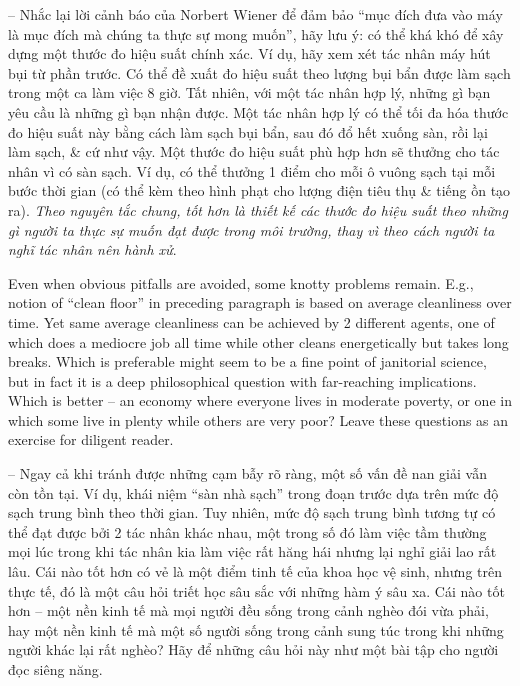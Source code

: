 \documentclass{article}
\begin{document}
\begin{itemize}
\begin{itemize}
\begin{itemize}
\begin{itemize}
				-- Nhắc lại lời cảnh báo của {\sc Norbert Wiener} để đảm bảo ``mục đích đưa vào máy là mục đích mà chúng ta thực sự mong muốn'', hãy lưu ý: có thể khá khó để xây dựng một thước đo hiệu suất chính xác. Ví dụ, hãy xem xét tác nhân máy hút bụi từ phần trước. Có thể đề xuất đo hiệu suất theo lượng bụi bẩn được làm sạch trong một ca làm việc 8 giờ. Tất nhiên, với một tác nhân hợp lý, những gì bạn yêu cầu là những gì bạn nhận được. Một tác nhân hợp lý có thể tối đa hóa thước đo hiệu suất này bằng cách làm sạch bụi bẩn, sau đó đổ hết xuống sàn, rồi lại làm sạch, \& cứ như vậy. Một thước đo hiệu suất phù hợp hơn sẽ thưởng cho tác nhân vì có sàn sạch. Ví dụ, có thể thưởng 1 điểm cho mỗi ô vuông sạch tại mỗi bước thời gian (có thể kèm theo hình phạt cho lượng điện tiêu thụ \& tiếng ồn tạo ra). {\it Theo nguyên tắc chung, tốt hơn là thiết kế các thước đo hiệu suất theo những gì người ta thực sự muốn đạt được trong môi trường, thay vì theo cách người ta nghĩ tác nhân nên hành xử}.
				
				Even when obvious pitfalls are avoided, some knotty problems remain. E.g., notion of ``clean floor'' in preceding paragraph is based on average cleanliness over time. Yet same average cleanliness can be achieved by 2 different agents, one of which does a mediocre job all time while other cleans energetically but takes long breaks. Which is preferable might seem to be a fine point of janitorial science, but in fact it is a deep philosophical question with far-reaching implications. Which is better -- an economy where everyone lives in moderate poverty, or one in which some live in plenty while others are very poor? Leave these questions as an exercise for diligent reader.
				
				-- Ngay cả khi tránh được những cạm bẫy rõ ràng, một số vấn đề nan giải vẫn còn tồn tại. Ví dụ, khái niệm ``sàn nhà sạch'' trong đoạn trước dựa trên mức độ sạch trung bình theo thời gian. Tuy nhiên, mức độ sạch trung bình tương tự có thể đạt được bởi 2 tác nhân khác nhau, một trong số đó làm việc tầm thường mọi lúc trong khi tác nhân kia làm việc rất hăng hái nhưng lại nghỉ giải lao rất lâu. Cái nào tốt hơn có vẻ là một điểm tinh tế của khoa học vệ sinh, nhưng trên thực tế, đó là một câu hỏi triết học sâu sắc với những hàm ý sâu xa. Cái nào tốt hơn -- một nền kinh tế mà mọi người đều sống trong cảnh nghèo đói vừa phải, hay một nền kinh tế mà một số người sống trong cảnh sung túc trong khi những người khác lại rất nghèo? Hãy để những câu hỏi này như một bài tập cho người đọc siêng năng.
				

\end{itemize}
\end{itemize}
\end{itemize}
\end{itemize}
\end{document}
